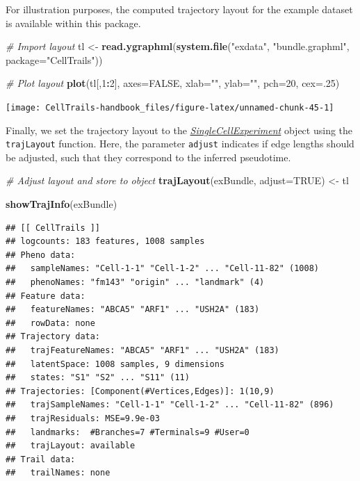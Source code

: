\documentclass[]{book}
\newenvironment{Shaded}{\begin{snugshade}}{\end{snugshade}}
\newcommand{\KeywordTok}[1]{\textcolor[rgb]{0.13,0.29,0.53}{\textbf{#1}}}
\newcommand{\DataTypeTok}[1]{\textcolor[rgb]{0.13,0.29,0.53}{#1}}
\newcommand{\DecValTok}[1]{\textcolor[rgb]{0.00,0.00,0.81}{#1}}
\newcommand{\StringTok}[1]{\textcolor[rgb]{0.31,0.60,0.02}{#1}}
\newcommand{\CommentTok}[1]{\textcolor[rgb]{0.56,0.35,0.01}{\textit{#1}}}
\newcommand{\OtherTok}[1]{\textcolor[rgb]{0.56,0.35,0.01}{#1}}
\newcommand{\OperatorTok}[1]{\textcolor[rgb]{0.81,0.36,0.00}{\textbf{#1}}}
\newcommand{\NormalTok}[1]{#1}
\theoremstyle{definition}
\theoremstyle{definition}
\theoremstyle{definition}
\theoremstyle{remark}
\begin{document}
For illustration purposes, the computed trajectory layout for the
example dataset is available within this package.

\begin{Shaded}
\begin{Highlighting}[]
\CommentTok{# Import layout}
\NormalTok{tl <-}\StringTok{ }\KeywordTok{read.ygraphml}\NormalTok{(}\KeywordTok{system.file}\NormalTok{(}\StringTok{"exdata"}\NormalTok{, }\StringTok{"bundle.graphml"}\NormalTok{, }
                                \DataTypeTok{package=}\StringTok{"CellTrails"}\NormalTok{))}

\CommentTok{# Plot layout}
\KeywordTok{plot}\NormalTok{(tl[,}\DecValTok{1}\OperatorTok{:}\DecValTok{2}\NormalTok{], }\DataTypeTok{axes=}\OtherTok{FALSE}\NormalTok{, }\DataTypeTok{xlab=}\StringTok{""}\NormalTok{, }\DataTypeTok{ylab=}\StringTok{""}\NormalTok{, }\DataTypeTok{pch=}\DecValTok{20}\NormalTok{, }\DataTypeTok{cex=}\NormalTok{.}\DecValTok{25}\NormalTok{)}
\end{Highlighting}
\end{Shaded}

\texttt{[image: CellTrails-handbook\_files/figure-latex/unnamed-chunk-45-1]}

Finally, we set the trajectory layout to the
\emph{\href{http://bioconductor.org/packages/SingleCellExperiment}{SingleCellExperiment}}
object using the \texttt{trajLayout} function. Here, the parameter
\texttt{adjust} indicates if edge lengths should be adjusted, such that
they correspond to the inferred pseudotime.

\begin{Shaded}
\begin{Highlighting}[]
\CommentTok{# Adjust layout and store to object}
\KeywordTok{trajLayout}\NormalTok{(exBundle, }\DataTypeTok{adjust=}\OtherTok{TRUE}\NormalTok{) <-}\StringTok{ }\NormalTok{tl}

\KeywordTok{showTrajInfo}\NormalTok{(exBundle)}
\end{Highlighting}
\end{Shaded}

\begin{verbatim}
## [[ CellTrails ]] 
## logcounts: 183 features, 1008 samples
## Pheno data: 
##   sampleNames: "Cell-1-1" "Cell-1-2" ... "Cell-11-82" (1008)
##   phenoNames: "fm143" "origin" ... "landmark" (4)
## Feature data: 
##   featureNames: "ABCA5" "ARF1" ... "USH2A" (183)
##   rowData: none
## Trajectory data: 
##   trajFeatureNames: "ABCA5" "ARF1" ... "USH2A" (183)
##   latentSpace: 1008 samples, 9 dimensions
##   states: "S1" "S2" ... "S11" (11)
## Trajectories: [Component(#Vertices,Edges)]: 1(10,9)
##   trajSampleNames: "Cell-1-1" "Cell-1-2" ... "Cell-11-82" (896)
##   trajResiduals: MSE=9.9e-03
##   landmarks:  #Branches=7 #Terminals=9 #User=0
##   trajLayout: available
## Trail data: 
##   trailNames: none
\end{verbatim}
\end{document}
